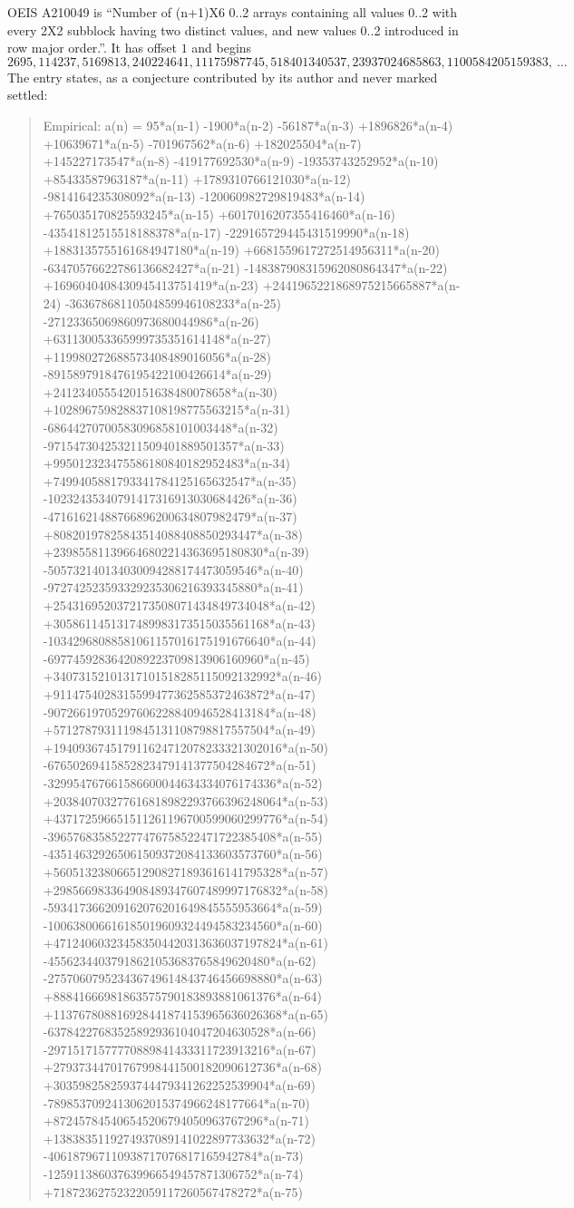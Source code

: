 \documentclass[11pt,a4paper]{article}
\theoremstyle{plain}
\theoremstyle{definition}
\begin{document}
OEIS A210049 is ``Number of (n+1)X6 0..2 arrays containing all values 0..2 with every 2X2 subblock having two distinct values, and new values 0..2 introduced in row major order.''. It has offset $1$ and begins
\[
2695, 114237, 5169813, 240224641, 11175987745, 518401340537, 23937024685863, 1100584205159383,\ \dots
\]
The entry states, as a conjecture contributed by its author and never marked settled:
\begin{quote}
Empirical: a(n) = 95*a(n-1) -1900*a(n-2) -56187*a(n-3) +1896826*a(n-4) +10639671*a(n-5) -701967562*a(n-6) +182025504*a(n-7) +145227173547*a(n-8) -419177692530*a(n-9) -19353743252952*a(n-10) +85433587963187*a(n-11) +1789310766121030*a(n-12) -9814164235308092*a(n-13) -120060982729819483*a(n-14) +765035170825593245*a(n-15) +6017016207355416460*a(n-16) -43541812515518188378*a(n-17) -229165729445431519990*a(n-18) +1883135755161684947180*a(n-19) +6681559617272514956311*a(n-20) -63470576622786136682427*a(n-21) -148387908315962080864347*a(n-22) +1696040408430945413751419*a(n-23) +2441965221868975215665887*a(n-24) -36367868110504859946108233*a(n-25) -27123365069860973680044986*a(n-26) +631130053365999735351614148*a(n-27) +119980272688573408489016056*a(n-28) -8915897918476195422100426614*a(n-29) +2412340555420151638480078658*a(n-30) +102896759828837108198775563215*a(n-31) -68644270700583096858101003448*a(n-32) -971547304253211509401889501357*a(n-33) +995012323475586180840182952483*a(n-34) +7499405881793341784125165632547*a(n-35) -10232435340791417316913030684426*a(n-36) -47161621488766896200634807982479*a(n-37) +80820197825843514088408850293447*a(n-38) +239855811396646802214363695180830*a(n-39) -505732140134030094288174473059546*a(n-40) -972742523593329235306216393345880*a(n-41) +2543169520372173508071434849734048*a(n-42) +3058611451317489983173515035561168*a(n-43) -10342968088581061157016175191676640*a(n-44) -6977459283642089223709813906160960*a(n-45) +34073152101317101518285115092132992*a(n-46) +9114754028315599477362585372463872*a(n-47) -90726619705297606228840946528413184*a(n-48) +5712787931119845131108798817557504*a(n-49) +194093674517911624712078233321302016*a(n-50) -67650269415852823479141377504284672*a(n-51) -329954767661586600044634334076174336*a(n-52) +203840703277616818982293766396248064*a(n-53) +437172596651511261196700599060299776*a(n-54) -396576835852277476758522471722385408*a(n-55) -435146329265061509372084133603573760*a(n-56) +560513238066512908271893616141795328*a(n-57) +298566983364908489347607489997176832*a(n-58) -593417366209162076201649845555953664*a(n-59) -100638006616185019609324494583234560*a(n-60) +471240603234583504420313636037197824*a(n-61) -45562344037918621053683765849620480*a(n-62) -275706079523436749614843746456698880*a(n-63) +88841666981863575790183893881061376*a(n-64) +113767808816928441874153965636026368*a(n-65) -63784227683525892936104047204630528*a(n-66) -29715171577770889841433311723913216*a(n-67) +27937344701767998441500182090612736*a(n-68) +3035982582593744479341262252539904*a(n-69) -7898537092413062015374966248177664*a(n-70) +872457845406545206794050963767296*a(n-71) +1383835119274937089141022897733632*a(n-72) -406187967110938717076817165942784*a(n-73) -125911386037639966549457871306752*a(n-74) +71872362752322059117260567478272*a(n-75) 
\end{quote}
\end{document}
